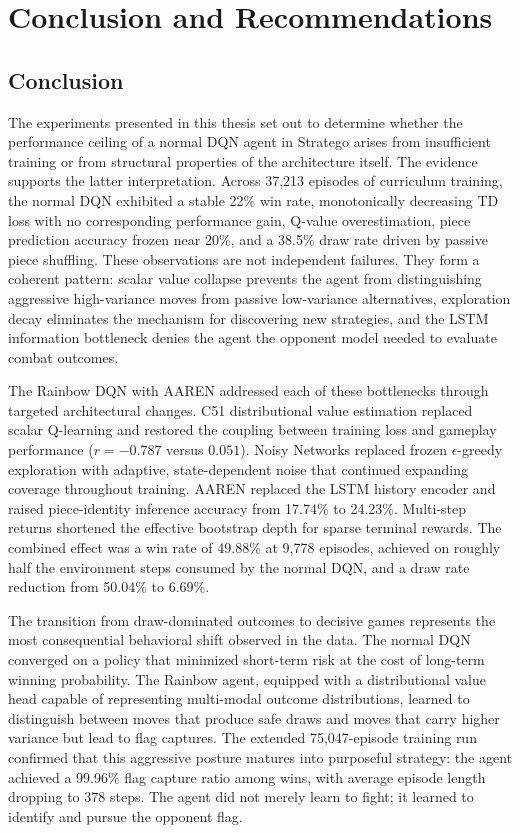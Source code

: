 \chapter{Conclusion and Recommendations}

\section{Conclusion}

The experiments presented in this thesis set out to determine whether the performance ceiling of a normal DQN agent in Stratego arises from insufficient training or from structural properties of the architecture itself. The evidence supports the latter interpretation. Across 37,213 episodes of curriculum training, the normal DQN exhibited a stable 22\% win rate, monotonically decreasing TD loss with no corresponding performance gain, Q-value overestimation, piece prediction accuracy frozen near 20\%, and a 38.5\% draw rate driven by passive piece shuffling. These observations are not independent failures. They form a coherent pattern: scalar value collapse prevents the agent from distinguishing aggressive high-variance moves from passive low-variance alternatives, exploration decay eliminates the mechanism for discovering new strategies, and the LSTM information bottleneck denies the agent the opponent model needed to evaluate combat outcomes.

The Rainbow DQN with AAREN addressed each of these bottlenecks through targeted architectural changes. C51 distributional value estimation replaced scalar Q-learning and restored the coupling between training loss and gameplay performance ($r = -0.787$ versus $0.051$). Noisy Networks replaced frozen $\epsilon$-greedy exploration with adaptive, state-dependent noise that continued expanding coverage throughout training. AAREN replaced the LSTM history encoder and raised piece-identity inference accuracy from 17.74\% to 24.23\%. Multi-step returns shortened the effective bootstrap depth for sparse terminal rewards. The combined effect was a win rate of 49.88\% at 9,778 episodes, achieved on roughly half the environment steps consumed by the normal DQN, and a draw rate reduction from 50.04\% to 6.69\%.

The transition from draw-dominated outcomes to decisive games represents the most consequential behavioral shift observed in the data. The normal DQN converged on a policy that minimized short-term risk at the cost of long-term winning probability. The Rainbow agent, equipped with a distributional value head capable of representing multi-modal outcome distributions, learned to distinguish between moves that produce safe draws and moves that carry higher variance but lead to flag captures. The extended 75,047-episode training run confirmed that this aggressive posture matures into purposeful strategy: the agent achieved a 99.96\% flag capture ratio among wins, with average episode length dropping to 378 steps. The agent did not merely learn to fight; it learned to identify and pursue the opponent flag.

